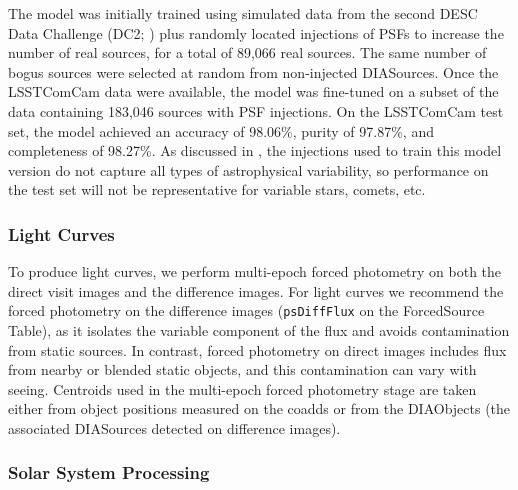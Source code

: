 The model was initially trained using simulated data from the second \gls{DESC} Data Challenge (DC2; \citep{2021ApJS..253...31L}) plus randomly located injections of PSFs to increase the number of real sources, for a total of 89,066 real sources.
The same number of bogus sources were selected at random from non-injected DIASources.
Once the  \gls{LSSTComCam} data were available, the model was fine-tuned on a subset of the data containing 183,046 sources with PSF injections.
On the \gls{LSSTComCam} test set, the model achieved an accuracy of 98.06\%, purity of 97.87\%, and completeness of 98.27\%.
As discussed in , the injections used to train this model version do not capture all types of astrophysical variability, so performance on the test set will not be representative for variable stars, comets, etc.


\subsubsection{Light Curves}
\label{sssec:lightcurves}
To produce light curves, we perform multi-epoch \gls{forced photometry} on both the direct visit images and the difference images.
For light curves we recommend the \gls{forced photometry} on the difference images (\texttt{psDiffFlux} on the ForcedSource Table), as it isolates the variable component of the flux and avoids contamination from static sources.
In contrast, \gls{forced photometry} on direct images includes flux from nearby or blended static objects, and this contamination can vary with seeing.
Centroids used in the multi-epoch \gls{forced photometry} stage are taken either from object positions measured on the coadds or from the DIAObjects (the associated DIASources detected on difference images).

\subsubsection{Solar System Processing
\label{sec:drp:solsys}}

